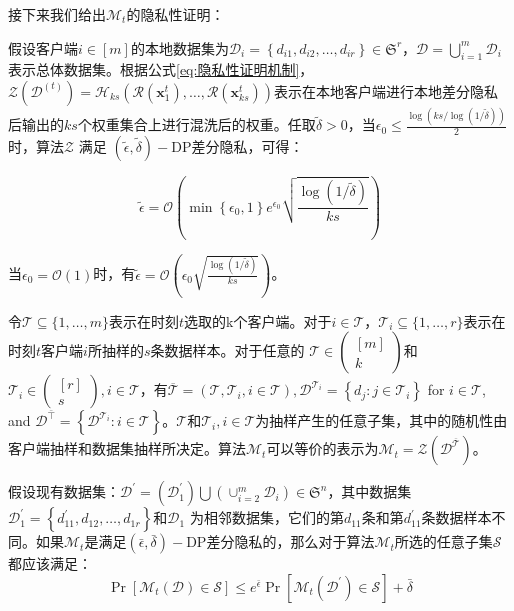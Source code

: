 接下来我们给出$\mathcal{M}_{t}$的隐私性证明：

假设客户端$i \in[m]$的本地数据集为$\mathcal{D}_{i}=\left\{d_{i 1}, d_{i 2}, \ldots, d_{i r}\right\} \in \mathfrak{S}^{r}$，$\mathcal{D}=\bigcup_{i=1}^{m} \mathcal{D}_{i}$表示总体数据集。根据公式\ref{eq:隐私性证明机制}，$\mathcal{Z}\left(\mathcal{D}^{(t)}\right)=\mathcal{H}_{k s}\left(\mathcal{R}\left(\boldsymbol{x}_{1}^{t}\right), \ldots, \mathcal{R}\left(\boldsymbol{x}_{k s}^{t}\right)\right)$表示在本地客户端进行本地差分隐私后输出的$ks$个权重集合上进行混洗后的权重。任取$\tilde{\delta}>0$，当$\epsilon_{0} \leq \frac{\log (k s / \log (1 / \tilde{\delta}))}{2}$时，算法$\mathcal{Z}$ 满足 $(\tilde{\epsilon}, \tilde{\delta})-\mathrm{DP}$差分隐私，可得：

\begin{equation}\label{eq:隐私性证明机制2}
\tilde{\epsilon}=\mathcal{O}\left(\min \left\{\epsilon_{0}, 1\right\} e^{\epsilon_{0}} \sqrt{\frac{\log (1 / \tilde{\delta})}{k s}}\right)
\end{equation}

当$\epsilon_{0}=\mathcal{O}(1)$时，有$\tilde{\epsilon}=\mathcal{O}\left(\epsilon_{0} \sqrt{\frac{\log (1 / \tilde{\delta})}{k s}}\right)$。

令$\mathcal{T} \subseteq\{1, \ldots, m\}$表示在时刻$t$选取的k个客户端。对于$i \in \mathcal{T}$，$\mathcal{T}_{i} \subseteq\{1, \ldots, r\}$表示在时刻$t$客户端$i$所抽样的$s$条数据样本。对于任意的 $\mathcal{T} \in\left(\begin{array}{c}{[m]} \\ k\end{array}\right)$和$\mathcal{T}_{i} \in\left(\begin{array}{c}{[r]} \\ s\end{array}\right), i \in \mathcal{T}$，有$\overline{\mathcal{T}}=\left(\mathcal{T}, \mathcal{T}_{i}, i \in \mathcal{T}\right), \mathcal{D}^{\mathcal{T}_{i}}=\left\{d_{j}: j \in \mathcal{T}_{i}\right\}$ for $i \in \mathcal{T}$, and $\mathcal{D}^{\bar{\top}}=\left\{\mathcal{D}^{\mathcal{T}_{i}}: i \in \mathcal{T}\right\}$。$\mathcal{T}$和$\mathcal{T}_{i}, i \in \mathcal{T}$为抽样产生的任意子集，其中的随机性由客户端抽样和数据集抽样所决定。算法$\mathcal{M}_{t}$可以等价的表示为$\mathcal{M}_{t}=\mathcal{Z}\left(\mathcal{D}^{\overline{\mathcal{T}}}\right)$。

假设现有数据集：$\mathcal{D}^{\prime}=\left(\mathcal{D}_{1}^{\prime}\right) \bigcup\left(\cup_{i=2}^{m} \mathcal{D}_{i}\right) \in \mathfrak{S}^{n}$，其中数据集$\mathcal{D}_{1}^{\prime}=\left\{d_{11}^{\prime}, d_{12}, \ldots, d_{1 r}\right\}$和$\mathcal{D}_{1}$ 为相邻数据集，它们的第$d_{11}$条和第$d_{11}^{\prime}$条数据样本不同。如果$\mathcal{M}_{t}$是满足$(\bar{\epsilon}, \bar{\delta})-\mathrm{DP}$差分隐私的，那么对于算法$\mathcal{M}_{t}$所选的任意子集$\mathcal{S}$ 都应该满足：
\begin{equation}\label{eq:隐私性证明3}
\operatorname{Pr}\left[\mathcal{M}_{t}(\mathcal{D}) \in \mathcal{S}\right] \leq e^{\bar{\epsilon}} \operatorname{Pr}\left[\mathcal{M}_{t}\left(\mathcal{D}^{\prime}\right) \in \mathcal{S}\right]+\bar{\delta}
\end{equation}

